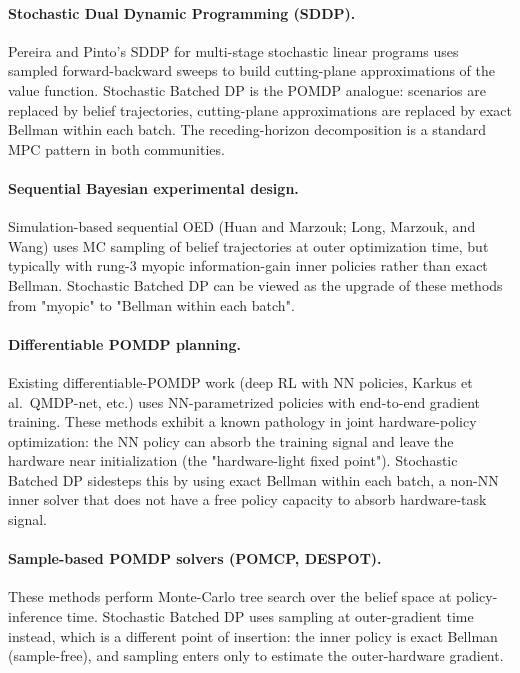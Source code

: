 \documentclass[11pt,a4paper]{article}
\begin{document}
\paragraph{Stochastic Dual Dynamic Programming (SDDP).}  Pereira and Pinto's SDDP for
multi-stage stochastic linear programs uses sampled forward-backward sweeps to build
cutting-plane approximations of the value function.  Stochastic Batched DP is the POMDP
analogue: scenarios are replaced by belief trajectories, cutting-plane approximations are
replaced by exact Bellman within each batch.  The receding-horizon decomposition is a
standard MPC pattern in both communities.

\paragraph{Sequential Bayesian experimental design.}  Simulation-based sequential OED
(Huan and Marzouk; Long, Marzouk, and Wang) uses MC sampling of belief trajectories at
outer optimization time, but typically with rung-3 myopic information-gain inner policies
rather than exact Bellman.  Stochastic Batched DP can be viewed as the upgrade of these
methods from "myopic" to "Bellman within each batch".

\paragraph{Differentiable POMDP planning.}  Existing differentiable-POMDP work (deep RL
with NN policies, Karkus et al.\ QMDP-net, etc.) uses NN-parametrized policies with
end-to-end gradient training.  These methods exhibit a known pathology in joint
hardware-policy optimization: the NN policy can absorb the training signal and leave the
hardware near initialization (the "hardware-light fixed point").  Stochastic Batched DP
sidesteps this by using exact Bellman within each batch, a non-NN inner solver that does
not have a free policy capacity to absorb hardware-task signal.

\paragraph{Sample-based POMDP solvers (POMCP, DESPOT).}  These methods perform Monte-Carlo
tree search over the belief space at policy-inference time.  Stochastic Batched DP uses
sampling at outer-gradient time instead, which is a different point of insertion: the
inner policy is exact Bellman (sample-free), and sampling enters only to estimate the
outer-hardware gradient.
\end{document}
